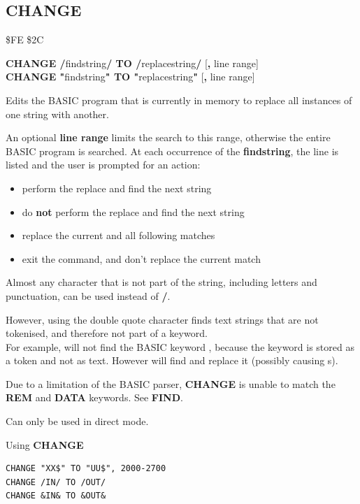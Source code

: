 \newpage
\subsection{CHANGE}
\begin{description}[leftmargin=2cm,style=nextline]
\item [Token:] \$FE \$2C
\item [Format:] {\bf CHANGE /}findstring{\bf/ TO /}replacestring{\bf/} [{\bf,} line range] \\
		{\bf CHANGE "}findstring{\bf" TO "}replacestring{\bf"} [{\bf,} line range]
\item [Usage:]  Edits the BASIC program
                that is currently in memory to replace all instances of one string with another.

   An optional {\bf line range} limits the search to this range,
   otherwise the entire BASIC program is searched.
   At each occurrence of the {\bf findstring}, the line is
   listed and the user is prompted for an action:
    \begin{itemize}
      \item {}  perform the replace and find the next string
      \item {}  do {\bf not} perform the replace and find the next string
      \item \megakey{*}  replace the current and all following matches
      \item {} exit the command, and don't replace the current match
    \end{itemize}
\item [Remarks:] Almost any character that is not part of the string,
   including letters and punctuation, can be used instead of {\bf /}.

   However, using the double quote character finds text strings that are
   not tokenised, and therefore not part of a keyword. \\
   For example,  will not find
   the BASIC keyword , because the
   keyword is stored as a token and not as text.
   However  will
   find and replace it (possibly causing s).

   Due to a limitation of the BASIC parser, {\bf CHANGE} is unable to match
   the {\bf REM} and {\bf DATA} keywords. See {\bf FIND}.

   Can only be used in direct mode.

\item [Examples:] Using {\bf CHANGE}
\begin{tcolorbox}[colback=black,coltext=white]
\verbatimfont{\codefont}
\begin{verbatim}
CHANGE "XX$" TO "UU$", 2000-2700
CHANGE /IN/ TO /OUT/
CHANGE &IN& TO &OUT&
\end{verbatim}
\end{tcolorbox}
\end{description}

